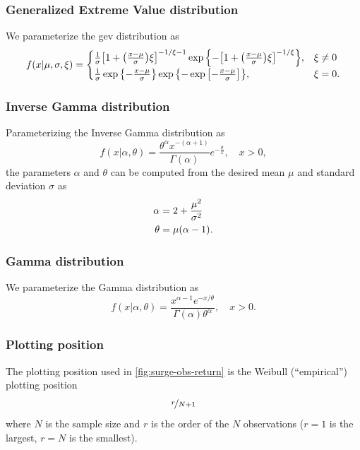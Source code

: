 \documentclass[11pt]{article}
\begin{document}
\subsubsection{Generalized Extreme Value distribution}
We parameterize the \gls{gev} distribution as
\begin{equation}\label{eq:gev-dist}
    f(x | \mu, \sigma, \xi)= \begin{cases}
        \frac{1}{\sigma} \qty[ 1 + \qty( \frac{x-\mu}{\sigma} ) \xi ]^{-1 / \xi - 1} \exp \qty{- \qty[1+\qty(\frac{x-\mu}{\sigma}) \xi ]^{-1 / \xi} }, & \xi \neq 0 \\
        \frac{1}{\sigma} \exp \qty{-\frac{x-\mu}{\sigma}} \exp \qty{ -\exp \qty[-\frac{x-\mu}{\sigma}]},                                               & \xi=0.
    \end{cases}
\end{equation}

\subsubsection{Inverse Gamma distribution}
Parameterizing the Inverse Gamma distribution as
\begin{equation}\label{eq:inv-gamma-dist}
    f(x | \alpha, \theta) = \frac{\theta^\alpha x^{-(\alpha + 1)}}{\Gamma(\alpha)} e^{-\frac{\theta}{x}}, \quad x > 0,
\end{equation}
the parameters $\alpha$ and $\theta$ can be computed from the desired mean $\mu$ and standard deviation $\sigma$ as
\begin{align}\label{eq:inv-gamma-params}
    \begin{split}
        \alpha &= 2 + \frac{\mu^2}{\sigma^2} \\
        \theta &= \mu \qty(\alpha - 1).
    \end{split}
\end{align}

\subsubsection{Gamma distribution}
We parameterize the Gamma distribution as
\begin{equation}\label{eq:gamma-dist}
    f(x | \alpha, \theta) = \frac{x^{\alpha-1} e^{-x/\theta}}{\Gamma(\alpha) \theta^\alpha},
    \quad x > 0.
\end{equation}

\subsubsection{Plotting position}
The plotting position used in \cref{fig:surge-obs-return} is the Weibull (``empirical'') plotting position
\begin{equation}\label{eq:weibull}
    \nicefrac{r}{N + 1}
\end{equation}
where $N$ is the sample size and $r$ is the order of the $N$ observations ($r=1$ is the largest, $r=N$ is the smallest).
\end{document}
